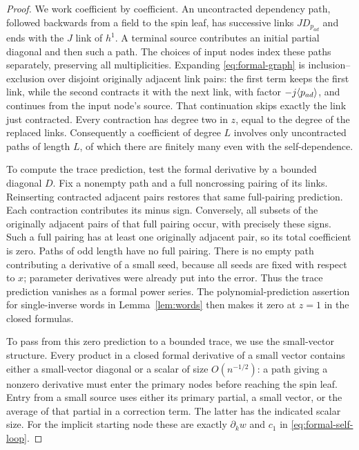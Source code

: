 \begin{proof}
We work coefficient by coefficient.  An uncontracted
dependency path, followed backwards from a field to the spin leaf, has
successive links $JD_{p_{ad}}$ and ends with the $J$ link of $h^1$.
A terminal source contributes an initial partial diagonal and then such
a path.  The choices of input nodes index these paths separately, preserving
all multiplicities.  Expanding \eqref{eq:formal-graph} is
inclusion--exclusion over disjoint originally adjacent link pairs: the
first term keeps the first link, while the second contracts it with the
next link, with factor $-j\langle p_{ad}\rangle$, and continues from the input
node's source.  That continuation skips exactly the link just contracted.
Every contraction has degree two in $z$, equal to the degree of the
replaced links.  Consequently a coefficient of degree $L$ involves only
uncontracted paths of length $L$, of which there are finitely many even
with the self-dependence.

To compute the trace prediction, test the formal derivative by a bounded
diagonal $D$. Fix a nonempty path and a full noncrossing pairing of its
links. Reinserting contracted adjacent pairs restores that same
full-pairing prediction.
Each contraction contributes its minus sign.  Conversely, all subsets of
the originally adjacent pairs of that full pairing occur, with precisely
these signs.  Such a full pairing has at least one originally adjacent
pair, so its total coefficient is zero.  Paths of odd length have no full
pairing.  There is no empty path contributing a derivative of a small
seed, because all seeds are fixed with respect to $x$; parameter
derivatives were already put into the error. Thus the trace prediction
vanishes as a formal power series. The
polynomial-prediction assertion for single-inverse words in
Lemma~\ref{lem:words} then makes it zero at $z=1$ in the closed formulas.

To pass from this zero prediction to a bounded trace, we use the
small-vector structure. Every product in a closed formal derivative
of a small vector contains
either a small-vector diagonal or a scalar of size $O(n^{-1/2})$:
a path giving a nonzero derivative must enter the primary nodes before
reaching the spin leaf.  Entry from a small source uses
either its primary partial, a small vector, or the average of that partial
in a correction term.  The latter has the indicated scalar size.
For the implicit starting node these are exactly
$\partial_k w$ and $c_1$ in \eqref{eq:formal-self-loop}.


\end{proof}
